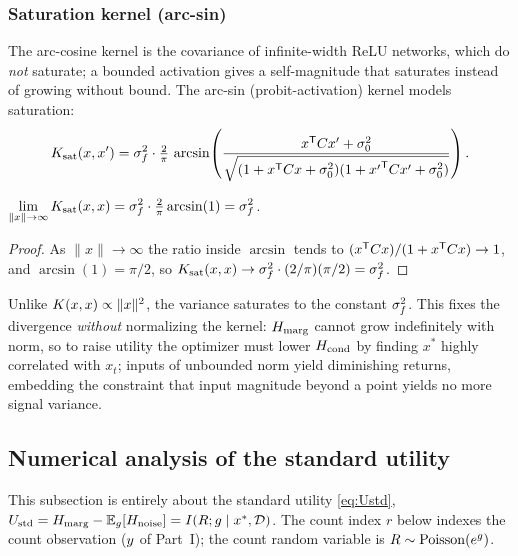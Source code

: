 \subsubsection{Saturation kernel (arc-sin)}
The arc-cosine kernel is the covariance of infinite-width ReLU networks, which do
\emph{not} saturate; a bounded activation gives a self-magnitude that saturates
instead of growing without bound. The arc-sin (probit-activation) kernel models
saturation:
\[
  K_{\mathrm{sat}}(x,x')=\sigma_{f}^{2}\cdot\tfrac2\pi\,\arcsin\!\left(\frac{x^{\mathsf{T}}C x'+\sigma_{0}^2}{\sqrt{(1+x^{\mathsf{T}}C x+\sigma_{0}^2)(1+{x'}^{\mathsf{T}}C x'+\sigma_{0}^2)}}\right).
\]
\begin{proposition}\label{prop:satkernel}
$\displaystyle\lim_{\lVert x\rVert\to\infty}K_{\mathrm{sat}}(x,x)=\sigma_{f}^{2}\cdot\tfrac2\pi\arcsin(1)=\sigma_{f}^{2}$.
\end{proposition}
\begin{proof}
As $\lVert x\rVert\to\infty$ the ratio inside $\arcsin$ tends to
$(x^{\mathsf{T}}C x)/(1+x^{\mathsf{T}}C x)\to1$, and $\arcsin(1)=\pi/2$, so
$K_{\mathrm{sat}}(x,x)\to\sigma_{f}^{2}\cdot(2/\pi)(\pi/2)=\sigma_{f}^{2}$.
\end{proof}
Unlike $K(x,x)\propto\lVert x\rVert^2$, the variance saturates to the constant
$\sigma_{f}^{2}$. This fixes the divergence \emph{without} normalizing the kernel: $H_{\mathrm{marg}}$
cannot grow indefinitely with norm, so to raise utility the optimizer must lower
$H_{\mathrm{cond}}$ by finding $x^*$ highly correlated with $x_t$; inputs of unbounded norm
yield diminishing returns, embedding the constraint that input magnitude beyond a
point yields no more signal variance.

\subsection{Numerical analysis of the standard utility}
\label{subsec:numerics}

This subsection is entirely about the standard utility \eqref{eq:Ustd},
$U_{\mathrm{std}}=H_{\mathrm{marg}}-\mathbb{E}_{g}[H_{\mathrm{noise}}]=I(R;g\mid x^*,\mathcal{D})$. The count index
$r$ below indexes the count observation ($y$ of Part~I); the count random
variable is $R\sim\mathrm{Poisson}(e^{g})$.

